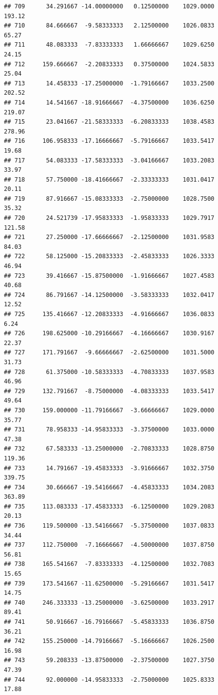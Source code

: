 \documentclass[
]{article}
\begin{document}
\begin{verbatim}
## 709      34.291667 -14.00000000   0.12500000    1029.0000      193.12
## 710      84.666667  -9.58333333   2.12500000    1026.0833       65.27
## 711      48.083333  -7.83333333   1.66666667    1029.6250       24.15
## 712     159.666667  -2.20833333   0.37500000    1024.5833       25.04
## 713      14.458333 -17.25000000  -1.79166667    1033.2500      202.52
## 714      14.541667 -18.91666667  -4.37500000    1036.6250      219.07
## 715      23.041667 -21.58333333  -6.20833333    1038.4583      278.96
## 716     106.958333 -17.16666667  -5.79166667    1033.5417       19.68
## 717      54.083333 -17.58333333  -3.04166667    1033.2083       33.97
## 718      57.750000 -18.41666667  -2.33333333    1031.0417       20.11
## 719      87.916667 -15.08333333  -2.75000000    1028.7500       35.32
## 720      24.521739 -17.95833333  -1.95833333    1029.7917      121.58
## 721      27.250000 -17.66666667  -2.12500000    1031.9583       84.03
## 722      58.125000 -15.20833333  -2.45833333    1026.3333       46.94
## 723      39.416667 -15.87500000  -1.91666667    1027.4583       40.68
## 724      86.791667 -14.12500000  -3.58333333    1032.0417       12.52
## 725     135.416667 -12.20833333  -4.91666667    1036.0833        6.24
## 726     198.625000 -10.29166667  -4.16666667    1030.9167       22.37
## 727     171.791667  -9.66666667  -2.62500000    1031.5000       31.73
## 728      61.375000 -10.58333333  -4.70833333    1037.9583       46.96
## 729     132.791667  -8.75000000  -4.08333333    1033.5417       49.64
## 730     159.000000 -11.79166667  -3.66666667    1029.0000       35.77
## 731      78.958333 -14.95833333  -3.37500000    1033.0000       47.38
## 732      67.583333 -13.25000000  -2.70833333    1028.8750      119.36
## 733      14.791667 -19.45833333  -3.91666667    1032.3750      339.75
## 734      30.666667 -19.54166667  -4.45833333    1034.2083      363.89
## 735     113.083333 -17.45833333  -6.12500000    1029.2083       20.13
## 736     119.500000 -13.54166667  -5.37500000    1037.0833       34.44
## 737     112.750000  -7.16666667  -4.50000000    1037.8750       56.81
## 738     165.541667  -7.83333333  -4.12500000    1032.7083       15.65
## 739     173.541667 -11.62500000  -5.29166667    1031.5417       14.75
## 740     246.333333 -13.25000000  -3.62500000    1033.2917       89.41
## 741      50.916667 -16.79166667  -5.45833333    1036.8750       36.21
## 742     155.250000 -14.79166667  -5.16666667    1026.2500       16.98
## 743      59.208333 -13.87500000  -2.37500000    1027.3750       47.39
## 744      92.000000 -14.95833333  -2.75000000    1025.8333       17.88

\end{verbatim}
\end{document}
